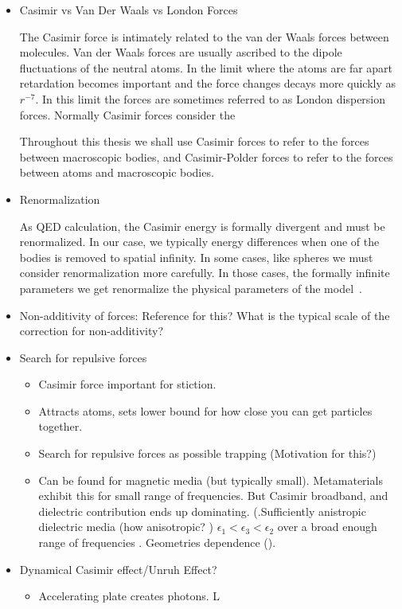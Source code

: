 \begin{itemize}
\item Casimir vs Van Der Waals vs London Forces

The Casimir force is intimately related to the van der Waals forces between molecules.  Van der Waals forces are usually ascribed to the dipole fluctuations of the neutral atoms.  In the limit where the atoms are far apart retardation becomes important and the force changes decays more quickly as $r^{-7}$.  In this limit the forces are sometimes referred to as London dispersion forces.  Normally Casimir forces consider the 

Throughout this thesis we shall use Casimir forces to refer to the forces between macroscopic bodies, and Casimir-Polder forces to refer to the forces between atoms and macroscopic bodies.  

\item Renormalization

As QED calculation, the Casimir energy is formally divergent and must be renormalized.  In our case, we typically energy differences when one of the bodies is removed to spatial infinity.  In some cases, like spheres we must consider renormalization more carefully.  In those cases, the formally infinite parameters we get renormalize the physical parameters of the model~\cite{Miltonbook2001}.  

\item Non-additivity of forces:  Reference for this?  What is the typical scale of the correction for non-additivity?

\item Search for repulsive forces

\begin{itemize}
\item Casimir force important for stiction.
\item Attracts atoms, sets lower bound for how close you can get particles together.
\item Search for repulsive forces as possible trapping (Motivation for this?)
\item Can be found for magnetic media (but typically small).  Metamaterials exhibit this for small range of frequencies.  But Casimir broadband, and dielectric contribution ends up dominating.  (.Sufficiently anistropic dielectric media (how anisotropic? ) $\epsilon_1<\epsilon_3<\epsilon_2$ over a broad enough range of frequencies .   Geometries dependence ().
\end{itemize}
\item Dynamical Casimir effect/Unruh Effect?
\begin{itemize}
  \item Accelerating plate creates photons.  L
\end{itemize}
\end{itemize}

